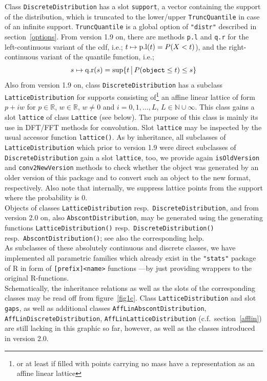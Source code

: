 \documentclass[11pt]{article}
\newcommand{\code}[1]{{\tt #1}}
\newcommand{\pkg}[1]{{\tt "#1"}}
\newcommand{\R}{\mathbb{R}}
\newcommand{\N}{\mathbb{N}}
\begin{document}
Class \code{DiscreteDistribution} has a slot \code{support}, a vector containing 
the support of the distribution, which is truncated to the lower/upper 
\code{TruncQuantile} in case of an infinite support. \code{TruncQuantile} is a 
global option of  \pkg{distr} described in section~{\ref{options}}. 
From version 1.9 on, there are methods \code{p.l} and \code{q.r} for the 
left-continuous variant of the cdf, i.e.; $t\mapsto {\rm p.l}(t)=P(X<t)$), and the 
right-continuous variant of the quantile function, i.e.;
$$
s\mapsto {\rm q.r}(s)=\sup\{t \,\big|\, P({\tt object}\leq t)\leq s\}
$$
Also from version 1.9 on, class \code{DiscreteDistribution} has a subclass 
\code{LatticeDistribution} for supports consisting of\footnote{or at least
if filled with points carrying no mass have a representation as an affine linear 
lattice} an affine linear lattice of form $p+iw$ for $p\in\R$, $w\in\R$, 
$w\not=0$ and $i=0,1,\ldots,L$, 
$L\in\N \cup\infty$. This class gains a slot \code{lattice} of 
class \code{Lattice} (see below). The purpose of this class is mainly its use 
in DFT/FFT methods for convolution. Slot \code{lattice} may be 
inspected by the usual accessor function \code{lattice()}.
As by inheritance, all subclasses of \code{LatticeDistribution} which prior to
version 1.9 were direct subclasses of \code{DiscreteDistribution} gain a 
slot \code{lattice}, too, we provide again \code{isOldVersion} and 
\code{conv2NewVersion} methods to check whether the object was generated by an 
older version of this package and to convert such an object to the new 
format, respectively. Also note that internally, we suppress lattice points from 
the support where the probability is $0$.\\        


Objects of classes \code{LatticeDistribution} resp.\ 
\code{DiscreteDistribution}, and from version 2.0 on, also 
\code{AbscontDistribution},  may be generated using the generating functions
\code{LatticeDistribution()} resp.\ \code{DiscreteDistribution()}
resp.\ \code{AbscontDistribution()}; see also
the corresponding help.
\\
As subclasses of these absolutely continuous and discrete classes, we have 
implemented all parametric families which already exist in the  \pkg{stats} 
package of {\sf R} in form of 
{\tt [prefix]<name>} functions ---by just providing wrappers to the original 
{\sf R}-functions.\\
%
Schematically, the inheritance relations as well as the slots 
of  the corresponding classes may be read off from figure~\ref{fig1c}. 
Class \code{LatticeDistribution} and slot \code{gaps}, as well as
additional classes \code{AffLinAbscontDistribution}, 
\code{AffLinDiscreteDistribution}, \code{AffLinLatticeDistribution} 
(c.f.\ section~\ref{afflin}) are still lacking in this graphic so far, however,
as well as the classes introduced in version 2.0.
\\
\end{document}
